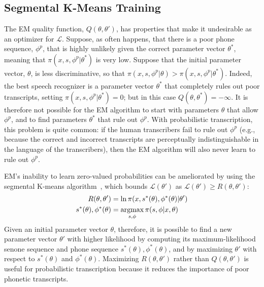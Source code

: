 \subsection{Segmental K-Means Training}

The EM quality function, $Q(\theta,\theta')$,
has properties that make it undesirable as an optimizer for ${\mathcal{L}}$.
Suppose, as often happens, that there is a poor phone
sequence, $\phi^p$, that is highly unlikely given the correct
parameter vector $\theta^*$, meaning that $\pi(x,s,\phi^p|\theta^*)$
is very low.  Suppose that the initial parameter vector, $\theta$, is
less discriminative, so that
$\pi(x,s,\phi^p|\theta)>\pi(x,s,\phi^p|\theta^*)$.
Indeed, the best speech recognizer is a parameter vector $\theta^*$
that completely rules out poor transcripts, setting
$\pi(x,s,\phi^p|\theta^*)=0$; but in this case
$Q(\theta,\theta^*)=-\infty$.
It is therefore not possible for the EM algorithm to start with
parameters $\theta$ that allow $\phi^p$, and to find parameters $\theta^*$
that rule out $\phi^p$.
With probabilistic
transcription, this problem is quite common: if the
human transcribers fail to rule out $\phi^p$ (e.g., because the
correct and incorrect transcripts are perceptually
indistinguishable in the language of the transcribers), then the EM
algorithm will also never learn to rule out $\phi^p$.

EM's inability to learn zero-valued probabilities can be ameliorated
by using the segmental K-means algorithm~\cite{Juang1990}, which
bounds ${\mathcal L}(\theta')$ as
$\mathcal{L}(\theta')\ge
R(\theta,\theta')$:
\begin{align}
  R(\theta,\theta') &= \ln \pi(x,s^*(\theta),\phi^*(\theta)|\theta')\\
  s^*(\theta),\phi^*(\theta)&= \operatorname*{argmax}_{s,\phi} \pi(s,\phi|x,\theta)
\end{align}
Given an initial parameter vector $\theta$, therefore, it is possible
to find a new parameter vector $\theta'$ with higher likelihood by
computing its maximum-likelihood senone sequence and phone sequence
$s^*(\theta),\phi^*(\theta)$, and by maximizing $\theta'$ with respect to
$s^*(\theta)$ and $\phi^*(\theta)$.
Maximizing
$R(\theta,\theta')$ rather than $Q(\theta,\theta')$ is useful for
probabilistic transcription because it reduces the importance of poor
phonetic transcripts.
